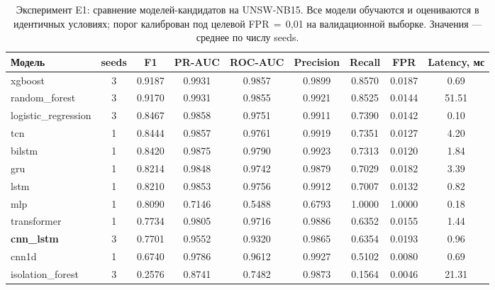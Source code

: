 \begin{table}[H]
\centering
\caption{Эксперимент E1: сравнение моделей-кандидатов на UNSW-NB15. Все модели обучаются и оцениваются в идентичных условиях; порог калиброван под целевой FPR\,$=$\,0{,}01 на валидационной выборке. Значения --- среднее по числу seeds.}
\label{tab:E1-summary}
\renewcommand{\arraystretch}{1.15}
\setlength{\tabcolsep}{4pt}
\small
\begin{tabularx}{\linewidth}{@{}lcccccccc@{}}
\toprule
\textbf{Модель} & \textbf{seeds} & \textbf{F1} & \textbf{PR-AUC} & \textbf{ROC-AUC} & \textbf{Precision} & \textbf{Recall} & \textbf{FPR} & \textbf{Latency, мс} \\
\midrule
xgboost & 3 & 0.9187 & 0.9931 & 0.9857 & 0.9899 & 0.8570 & 0.0187 & 0.69 \\
random\_forest & 3 & 0.9170 & 0.9931 & 0.9855 & 0.9921 & 0.8525 & 0.0144 & 51.51 \\
logistic\_regression & 3 & 0.8467 & 0.9858 & 0.9751 & 0.9911 & 0.7390 & 0.0142 & 0.10 \\
tcn & 1 & 0.8444 & 0.9857 & 0.9761 & 0.9919 & 0.7351 & 0.0127 & 4.20 \\
bilstm & 1 & 0.8420 & 0.9875 & 0.9790 & 0.9923 & 0.7313 & 0.0120 & 1.84 \\
gru & 1 & 0.8214 & 0.9848 & 0.9742 & 0.9879 & 0.7029 & 0.0182 & 3.39 \\
lstm & 1 & 0.8210 & 0.9853 & 0.9756 & 0.9912 & 0.7007 & 0.0132 & 0.82 \\
mlp & 1 & 0.8090 & 0.7146 & 0.5488 & 0.6793 & 1.0000 & 1.0000 & 0.18 \\
transformer & 1 & 0.7734 & 0.9805 & 0.9716 & 0.9886 & 0.6352 & 0.0155 & 1.44 \\
\textbf{cnn\_lstm} & 3 & 0.7701 & 0.9552 & 0.9320 & 0.9865 & 0.6354 & 0.0193 & 0.96 \\
cnn1d & 1 & 0.6740 & 0.9786 & 0.9612 & 0.9927 & 0.5102 & 0.0080 & 0.69 \\
isolation\_forest & 3 & 0.2576 & 0.8741 & 0.7482 & 0.9873 & 0.1564 & 0.0046 & 21.31 \\
\bottomrule
\end{tabularx}
\end{table}